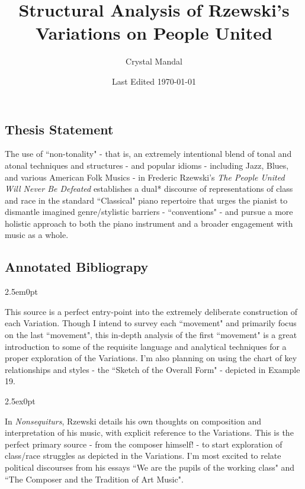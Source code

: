 \documentclass[14pt, letterpaper]{article}
\title{ \vspace*{-72pt} Structural Analysis of Rzewski's Variations on People United}
\author{Crystal Mandal}
\date{Last Edited \today}
\begin{document}
\maketitle

\subsection*{Thesis Statement}

The use of ``non-tonality" - that is, an extremely intentional blend of tonal and atonal techniques and structures - and popular idioms - including Jazz, Blues, and various American Folk Musics - in Frederic Rzewski's \textit{The People United Will Never Be Defeated} establishes a dual* discourse of representations of class and race in the standard ``Classical" piano repertoire that urges the pianist to dismantle imagined genre/stylistic barriers - ``conventions" - and pursue a more holistic approach to both the piano instrument and a broader engagement with music as a whole.

\clearpage{}


\subsection*{Annotated Bibliograpy}


\begin{adjustwidth}{2.5em}{0pt}

  This source is a perfect entry-point into the extremely deliberate construction of each Variation. Though I intend to survey each ``movement" and primarily focus on the last ``movement", this in-depth analysis of the first ``movement" is a great introduction to some of the requisite language and analytical techniques for a proper exploration of the Variations. I'm also planning on using the chart of key relationships and styles - the ``Sketch of the Overall Form" - depicted in Example 19.

\end{adjustwidth}

\clearpage


\begin{adjustwidth}{2.5ex}{0pt}

  In \textit{Nonsequiturs}, Rzewski details his own thoughts on composition and interpretation of his music, with explicit reference to the Variations. This is the perfect primary source - from the composer himself! - to start exploration of class/race struggles as depicted in the Variations. I'm most excited to relate political discourses from his essays ``We are the pupils of the working class" and ``The Composer and the Tradition of Art Music".

\end{adjustwidth}
\end{document}
